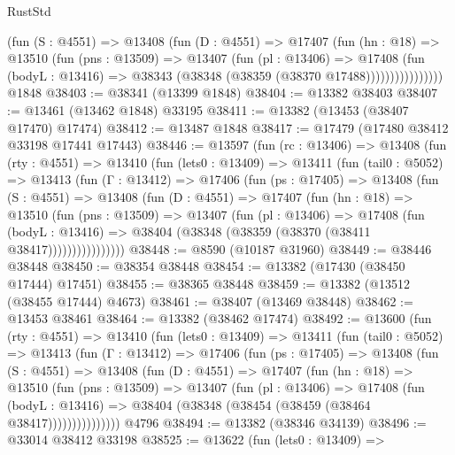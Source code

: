 \begin{lexlean}{RustStd}
\begin{coremodule}
                  (fun (S : @4551) =>
                  @13408
                    (fun (D : @4551) =>
                    @17407
                      (fun (hn : @18) =>
                      @13510
                        (fun (pns : @13509) =>
                        @13407
                          (fun (pl : @13406) =>
                          @17408
                            (fun (bodyL : @13416) =>
                            @38343 (@38348 (@38359 (@38370 @17488))))))))))))))))
    @1848
@38403 := @38341 (@13399 @1848)
@38404 := @13382 @38403
@38407 := @13461 (@13462 @1848) @33195
@38411 := @13382 (@13453 (@38407 @17470) @17474)
@38412 := @13487 @1848
@38417 := @17479 (@17480 @38412 @33198 @17441 @17443)
@38446 := @13597
    (fun (rc : @13406) =>
    @13408
      (fun (rty : @4551) =>
      @13410
        (fun (lets0 : @13409) =>
        @13411
          (fun (tail0 : @5052) =>
          @13413
            (fun (Γ : @13412) =>
            @17406
              (fun (ps : @17405) =>
              @13408
                (fun (S : @4551) =>
                @13408
                  (fun (D : @4551) =>
                  @17407
                    (fun (hn : @18) =>
                    @13510
                      (fun (pns : @13509) =>
                      @13407
                        (fun (pl : @13406) =>
                        @17408
                          (fun (bodyL : @13416) =>
                          @38404 (@38348 (@38359 (@38370 (@38411 @38417))))))))))))))))
@38448 := @8590 (@10187 @31960)
@38449 := @38446 @38448
@38450 := @38354 @38448
@38454 := @13382 (@17430 (@38450 @17444) @17451)
@38455 := @38365 @38448
@38459 := @13382 (@13512 (@38455 @17444) @4673)
@38461 := @38407 (@13469 @38448)
@38462 := @13453 @38461
@38464 := @13382 (@38462 @17474)
@38492 := @13600
    (fun (rty : @4551) =>
    @13410
      (fun (lets0 : @13409) =>
      @13411
        (fun (tail0 : @5052) =>
        @13413
          (fun (Γ : @13412) =>
          @17406
            (fun (ps : @17405) =>
            @13408
              (fun (S : @4551) =>
              @13408
                (fun (D : @4551) =>
                @17407
                  (fun (hn : @18) =>
                  @13510
                    (fun (pns : @13509) =>
                    @13407
                      (fun (pl : @13406) =>
                      @17408
                        (fun (bodyL : @13416) =>
                        @38404 (@38348 (@38454 (@38459 (@38464 @38417)))))))))))))))
    @4796
@38494 := @13382 (@38346 @34139)
@38496 := @33014 @38412 @33198
@38525 := @13622
    (fun (lets0 : @13409) =>

\end{coremodule}
\end{lexlean}
